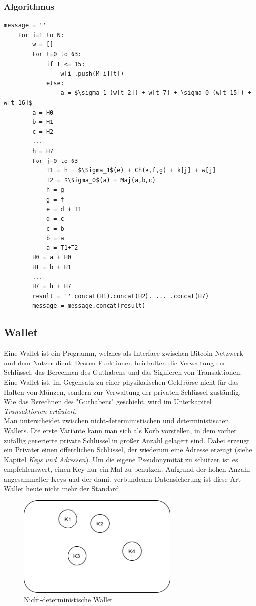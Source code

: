 \subsubsection{Algorithmus}
\begin{lstlisting}[mathescape]
	message = ''
	For i=1 to N:
		w = []
		For t=0 to 63:
			if t <= 15:
				w[i].push(M[i][t])
			else:
				a = $\sigma_1 (w[t-2]) + w[t-7] + \sigma_0 (w[t-15]) + w[t-16]$
		a = H0
		b = H1
		c = H2
		...
		h = H7
		For j=0 to 63
			T1 = h + $\Sigma_1$(e) + Ch(e,f,g) + k[j] + w[j]
			T2 = $\Sigma_0$(a) + Maj(a,b,c)
			h = g
			g = f
			e = d + T1
			d = c
			c = b
			b = a
			a = T1+T2
		H0 = a + H0
		H1 = b + H1
		...
		H7 = h + H7
		result = ''.concat(H1).concat(H2). ... .concat(H7)
		message = message.concat(result)
\end{lstlisting} 
\subsection{Wallet}
Eine Wallet ist ein Programm, welches als Interface zwischen Bitcoin-Netzwerk und dem Nutzer dient. 
Dessen Funktionen beinhalten die Verwaltung der Schlüssel, das Berechnen des Guthabens und das Signieren von Transaktionen.
Eine Wallet ist, im Gegensatz zu einer physikalischen Geldbörse nicht für das Halten von Münzen, sondern zur Verwaltung der privaten Schlüssel zuständig. 
Wie das Berechnen des "Guthabens" geschieht, wird im Unterkapitel \emph{Transaktionen erläutert}.\\
Man unterscheidet zwischen nicht-deterministischen und deterministischen Wallets. Die erste Variante kann man sich als Korb vorstellen, in dem vorher zufällig generierte private Schlüssel in großer Anzahl gelagert sind. Dabei erzeugt ein Privater einen öffentlichen Schlüssel, der wiederum eine Adresse erzeugt (siehe Kapitel \emph{Keys und Adressen}).
Um die eigene Pseudonymität zu schützen ist es empfehlenswert, einen Key nur ein Mal zu benutzen. Aufgrund der hohen Anzahl angesammelter Keys und der damit verbundenen Datensicherung ist diese Art Wallet heute nicht mehr der Standard.\\
\begin{figure}[htpb]
	\centering
	\includegraphics[width=0.7\textwidth]{images/non_det_wallet.png}
	\caption{Nicht-deterministische Wallet}
	\label{6braun:fig:non-deterministic_wallet}
\end{figure}
